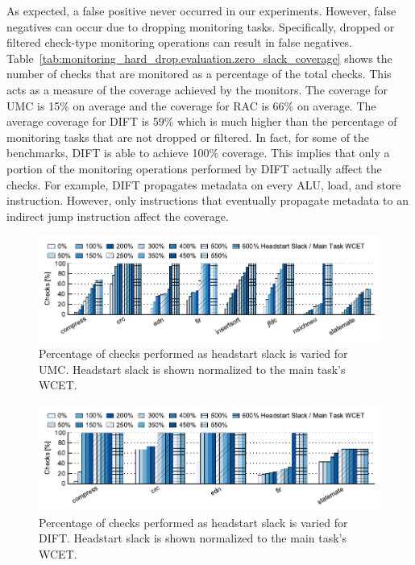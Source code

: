 As expected, a false positive never occurred in our experiments. However, false
negatives can occur due to dropping monitoring tasks. Specifically, dropped or
filtered check-type monitoring operations can result in false negatives.
Table~\ref{tab:monitoring_hard_drop.evaluation.zero_slack_coverage} shows the
number of checks that are monitored as a percentage of the total checks. This
acts as a measure of the coverage achieved by the monitors. The coverage for
UMC is 15\% on average and the coverage for RAC is 66\% on average. The average
coverage for DIFT is 59\% which is much higher than the percentage of
monitoring tasks that are not dropped or filtered. In fact, for some of the
benchmarks, DIFT is able to achieve 100\% coverage. This implies that only a
portion of the monitoring operations performed by DIFT actually affect the
checks.  For example, DIFT propagates metadata on every ALU, load, and store
instruction. However, only instructions that eventually propagate metadata to
an indirect jump instruction affect the coverage.

\begin{figure}
  \begin{center}
    \includegraphics{monitoring_hard_drop/data/umc_sweep.pdf}
    \caption{Percentage of checks performed as headstart slack is varied for
    UMC. Headstart slack is shown normalized to the main task's WCET.}
    \label{fig:monitoring_hard_drop.evaluation.umc_sweep}
  \end{center}
\end{figure}

\begin{figure}
  \begin{center}
    \includegraphics{monitoring_hard_drop/data/dift_sweep.pdf}
    \caption{Percentage of checks performed as headstart slack is varied for
    DIFT. Headstart slack is shown normalized to the main task's WCET.}
    \label{fig:monitoring_hard_drop.evaluation.dift_sweep}
  \end{center}
\end{figure}

